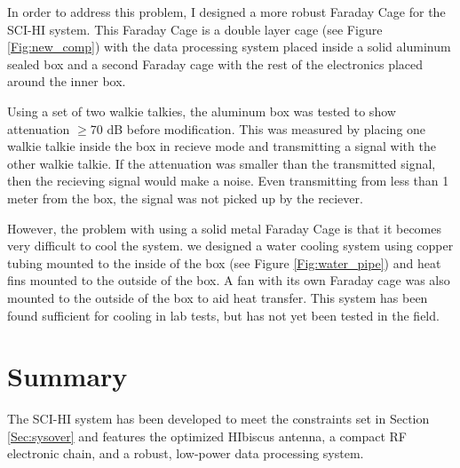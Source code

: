 In order to address this problem, I designed a more robust Faraday Cage for the SCI-HI system. This Faraday Cage is a double layer cage (see Figure \ref{Fig:new_comp}) with the data processing system placed inside a solid aluminum sealed box and a second Faraday cage with the rest of the electronics placed around the inner box. 

Using a set of two walkie talkies, the aluminum box was tested to show attenuation $\geq$70 dB before modification. This was measured by placing one walkie talkie inside the box in recieve mode and transmitting a signal with the other walkie talkie. If the attenuation was smaller than the transmitted signal, then the recieving signal would make a noise. Even transmitting from less than 1 meter from the box, the signal was not picked up by the reciever. 

However, the problem with using a solid metal Faraday Cage is that it becomes very difficult to cool the system. we designed a water cooling system using copper tubing mounted to the inside of the box (see Figure \ref{Fig:water_pipe}) and heat fins mounted to the outside of the box. A fan with its own Faraday cage was also mounted to the outside of the box to aid heat transfer. This system has been found sufficient for cooling in lab tests, but has not yet been tested in the field. 

\section{Summary}

The SCI-HI system has been developed to meet the constraints set in Section \ref{Sec:sysover} and features the optimized HIbiscus antenna, a compact RF electronic chain, and a robust, low-power data processing system. 
